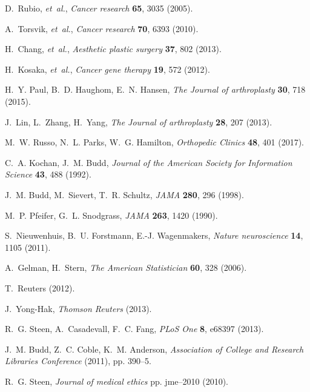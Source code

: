 \documentclass[12pt]{article}
\begin{document}
\begin{thebibliography}{10}

D.~Rubio, {\it et~al.\/}, {\it Cancer research\/} {\bf 65}, 3035 (2005).

A.~Torsvik, {\it et~al.\/}, {\it Cancer research\/} {\bf 70}, 6393 (2010).

H.~Chang, {\it et~al.\/}, {\it Aesthetic plastic surgery\/} {\bf 37}, 802
  (2013).

H.~Kosaka, {\it et~al.\/}, {\it Cancer gene therapy\/} {\bf 19}, 572 (2012).

H.~Y. Paul, B.~D. Haughom, E.~N. Hansen, {\it The Journal of arthroplasty\/}
  {\bf 30}, 718 (2015).

J.~Lin, L.~Zhang, H.~Yang, {\it The Journal of arthroplasty\/} {\bf 28}, 207
  (2013).

M.~W. Russo, N.~L. Parks, W.~G. Hamilton, {\it Orthopedic Clinics\/} {\bf 48},
  401 (2017).

C.~A. Kochan, J.~M. Budd, {\it Journal of the American Society for Information
  Science\/} {\bf 43}, 488 (1992).

J.~M. Budd, M.~Sievert, T.~R. Schultz, {\it JAMA\/} {\bf 280}, 296 (1998).

M.~P. Pfeifer, G.~L. Snodgrass, {\it JAMA\/} {\bf 263}, 1420 (1990).

S.~Nieuwenhuis, B.~U. Forstmann, E.-J. Wagenmakers, {\it Nature neuroscience\/}
  {\bf 14}, 1105 (2011).

A.~Gelman, H.~Stern, {\it The American Statistician\/} {\bf 60}, 328 (2006).

T.~Reuters  (2012).

J.~Yong-Hak, {\it Thomson Reuters\/}  (2013).

R.~G. Steen, A.~Casadevall, F.~C. Fang, {\it PLoS One\/} {\bf 8}, e68397
  (2013).

J.~M. Budd, Z.~C. Coble, K.~M. Anderson, {\it Association of College and
  Research Libraries Conference\/} (2011), pp. 390--5.

R.~G. Steen, {\it Journal of medical ethics\/} pp. jme--2010 (2010).


\end{thebibliography}
\end{document}
